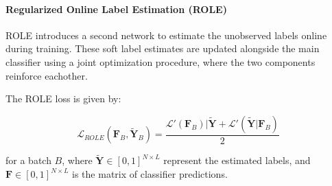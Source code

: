 \documentclass[lettersize,journal]{IEEEtran}
\begin{document}
\paragraph{Regularized Online Label Estimation (ROLE)}
ROLE introduces a second network to estimate the unobserved labels online during training. These soft label estimates are updated alongside the main classifier using a joint optimization procedure, where the two components reinforce eachother. 





\noindent The ROLE loss is given by:

\begin{equation}
    \mathcal{L}_{ROLE}(\mathbf{F}_B, \mathbf{\tilde{Y}}_B) = \frac{\mathcal{L}'(\mathbf{F}_B)|\mathbf{\tilde{Y}}+\mathcal{L}'(\mathbf{\tilde{Y}}|\mathbf{F}_B)}{2}
\end{equation}

\noindent for a batch $B$, where $\mathbf{\tilde{Y}}\in[0,1]^{N\times L}$ represent the estimated labels, and $\mathbf{F}\in[0,1]^{N\times L}$ is the matrix of classifier predictions.




\end{document}
